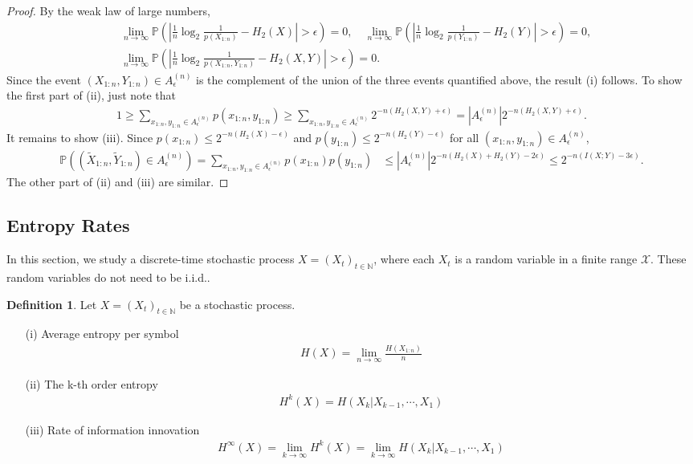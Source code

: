 \documentclass{article}
\numberwithin{equation}{section}
\newcommand{\bbN}{\mathbb{N}}
\newcommand{\bbP}{\mathbb{P}}
\renewcommand{\cal}{\mathcal}
\newcommand{\wt}{\widetilde}
\theoremstyle{plain}
\theoremstyle{definition}
\newtheorem{definition}[theorem]{Definition}
\begin{document}
\begin{proof}
By the weak law of large numbers,
\begin{align*}
	&\lim_{n\to\infty}\bbP\left(\left\vert\frac{1}{n}\log_2 \frac{1}{p(X_{1:n})}-H_2(X)\right\vert>\epsilon\right)=0,\quad \lim_{n\to\infty}\bbP\left(\left\vert\frac{1}{n}\log_2 \frac{1}{p(Y_{1:n})}-H_2(Y)\right\vert>\epsilon\right)=0,\\		&\lim_{n\to\infty}\bbP\left(\left\vert\frac{1}{n}\log_2 \frac{1}{p(X_{1:n},Y_{1:n})}-H_2(X,Y)\right\vert>\epsilon\right)=0.
\end{align*}
Since the event $(X_{1:n},Y_{1:n})\in A_\epsilon^{(n)}$ is the complement of the union of the three events quantified above, the result (i) follows. To show the first part of (ii), just note that
\begin{align*}
	1\geq \sum_{x_{1:n},y_{1:n}\in A_\epsilon^{(n)}}p(x_{1:n},y_{1:n})\geq \sum_{x_{1:n},y_{1:n}\in A_\epsilon^{(n)}}2^{-n(H_2(X,Y)+\epsilon)}=\left\vert A_\epsilon^{(n)}\right\vert 2^{-n(H_2(X,Y)+\epsilon)}.
\end{align*}
It remains to show (iii). Since $p(x_{1:n})\leq 2^{-n(H_2(X)-\epsilon)}$ and $p(y_{1:n})\leq 2^{-n(H_2(Y)-\epsilon)}$ for all $(x_{1:n},y_{1:n})\in A_\epsilon^{(n)}$,
\begin{align*}
\bbP\left((\wt{X}_{1:n},\wt{Y}_{1:n})\in A_\epsilon^{(n)}\right)=\sum_{x_{1:n},y_{1:n}\in A_\epsilon^{(n)}}p(x_{1:n})p(y_{1:n})&\leq\left\vert A_\epsilon^{(n)}\right\vert 2^{-n(H_2(X)+H_2(Y)-2\epsilon)}\leq 2^{-n(I(X;Y)-3\epsilon)}.
\end{align*}
The other part of (ii) and (iii) are similar.
\end{proof}

\subsection{Entropy Rates}
In this section, we study a discrete-time stochastic process $X=(X_t)_{t\in\bbN}$, where each $X_t$ is a random variable in a finite range $\cal{X}$. These random variables do not need to be i.i.d..
\begin{definition}
Let $X=(X_t)_{t\in\bbN}$ be a stochastic process.
\begin{itemize}
\item[(i)] Average entropy per symbol
\begin{align*}
H(X)=\lim_{n\to\infty}\frac{H(X_{1:n})}{n}
\end{align*}
\item[(ii)] The k-th order entropy
\begin{align*}
	H^k(X)=H(X_k|X_{k-1},\cdots,X_1)
\end{align*}
\item[(iii)] Rate of information innovation
\begin{align*}
	H^\infty(X)=\lim_{k\to\infty}H^k(X)=\lim_{k\to\infty} H(X_k|X_{k-1},\cdots,X_1)
\end{align*}
\end{itemize}
\end{definition}
\end{document}
